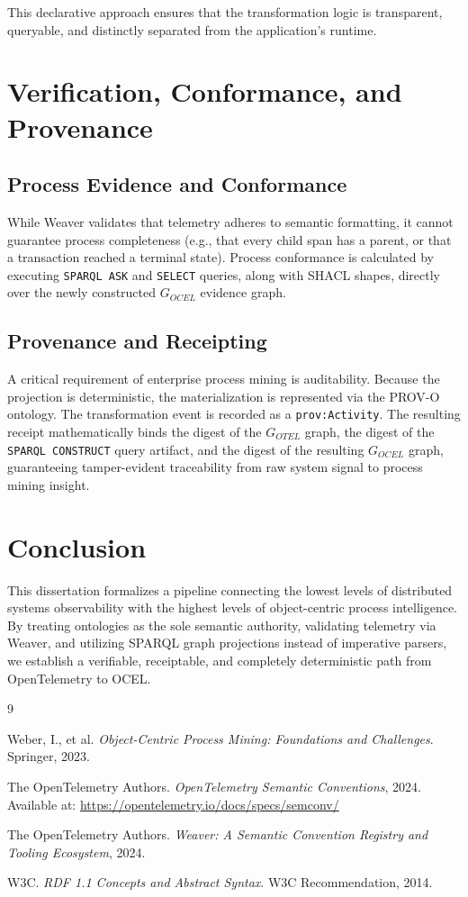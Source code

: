 \documentclass[12pt,a4paper,oneside]{book}
\begin{document}
This declarative approach ensures that the transformation logic is transparent, queryable, and distinctly separated from the application's runtime.

\chapter{Verification, Conformance, and Provenance}

\section{Process Evidence and Conformance}
While Weaver validates that telemetry adheres to semantic formatting, it cannot guarantee process completeness (e.g., that every child span has a parent, or that a transaction reached a terminal state). Process conformance is calculated by executing \texttt{SPARQL ASK} and \texttt{SELECT} queries, along with SHACL shapes, directly over the newly constructed $G_{OCEL}$ evidence graph.

\section{Provenance and Receipting}
A critical requirement of enterprise process mining is auditability. Because the projection is deterministic, the materialization is represented via the PROV-O ontology. The transformation event is recorded as a \texttt{prov:Activity}. The resulting receipt mathematically binds the digest of the $G_{OTEL}$ graph, the digest of the \texttt{SPARQL CONSTRUCT} query artifact, and the digest of the resulting $G_{OCEL}$ graph, guaranteeing tamper-evident traceability from raw system signal to process mining insight.

\chapter{Conclusion}
This dissertation formalizes a pipeline connecting the lowest levels of distributed systems observability with the highest levels of object-centric process intelligence. By treating ontologies as the sole semantic authority, validating telemetry via Weaver, and utilizing SPARQL graph projections instead of imperative parsers, we establish a verifiable, receiptable, and completely deterministic path from OpenTelemetry to OCEL.

\backmatter

\begin{thebibliography}{9}

Weber, I., et al. \textit{Object-Centric Process Mining: Foundations and Challenges}. Springer, 2023.

The OpenTelemetry Authors. \textit{OpenTelemetry Semantic Conventions}, 2024. Available at: \url{https://opentelemetry.io/docs/specs/semconv/}

The OpenTelemetry Authors. \textit{Weaver: A Semantic Convention Registry and Tooling Ecosystem}, 2024.

W3C. \textit{RDF 1.1 Concepts and Abstract Syntax}. W3C Recommendation, 2014.

\end{thebibliography}
\end{document}
